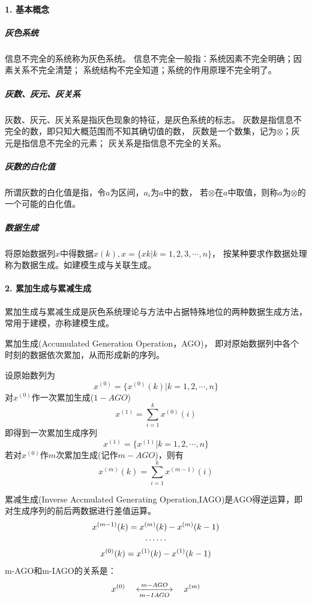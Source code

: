 \paragraph*{1. 基本概念}
\subparagraph*{灰色系统}
信息不完全的系统称为灰色系统。
信息不完全一般指：系统因素不完全明确；因素关系不完全清楚；
系统结构不完全知道；系统的作用原理不完全明了。
\subparagraph*{灰数、灰元、灰关系}
灰数、灰元、灰关系是指灰色现象的特征，是灰色系统的标志。
灰数是指信息不完全的数，即只知大概范围而不知其确切值的数，
灰数是一个数集，记为$\otimes$；灰元是指信息不完全的元素；
灰关系是指信息不完全的关系。
\subparagraph*{灰数的白化值}
所谓灰数的白化值是指，令$a$为区间，$a_i$为$a$中的数，
若$\otimes$在$a$中取值，则称$a$为$\otimes$的一个可能的白化值。
\subparagraph*{数据生成}
将原始数据列$x$中得数据$x(k), x=\{x{k}|k=1,2,3,\cdots,n\}$，
按某种要求作数据处理称为数据生成。如建模生成与关联生成。
\paragraph*{2. 累加生成与累减生成}
累加生成与累减生成是灰色系统理论与方法中占据特殊地位的两种数据生成方法，
常用于建模，亦称建模生成。

累加生成(Accumulated Generation Operation，AGO)，
即对原始数据列中各个时刻的数据依次累加，从而形成新的序列。

设原始数列为
\begin{equation}
x^{(0)}=\{x^{(0)}(k)|k=1,2,\cdots,n\}
\end{equation}
对$x^{(0)}$作一次累加生成($1-AGO$)
\begin{equation}
x^{(1)}=\sum^k_{i=1}x^{(0)}(i)
\end{equation}
即得到一次累加生成序列
\begin{equation}
x^{(1)}=\{x^{(1)}|k=1,2,\cdots,n\}
\end{equation}
若对$x^{(0)}$作$m$次累加生成(记作$m-AGO$)，则有
\begin{equation}
x^{(m)}(k)=\sum^k_{i=1} x^{(m-1)}(i)
\end{equation}

累减生成(Inverse Accmulated Generating Operation,IAGO)是AGO得逆运算，即对生成序列的前后两数据进行差值运算。
\begin{gather}
x^{(m-1)}(k)=x^{(m)}(k)-x^{(m)}(k-1) \notag \\
\cdots\cdots \\
x^{(0)}(k)=x^{(1)}(k)-x^{(1)}(k-1)  \notag
\end{gather}
m-AGO和m-IAGO的关系是：
\begin{equation}
x^{(0)} \quad \xleftrightarrow[m-IAGO]{m-AGO} \quad x^{(m)}
\end{equation}

